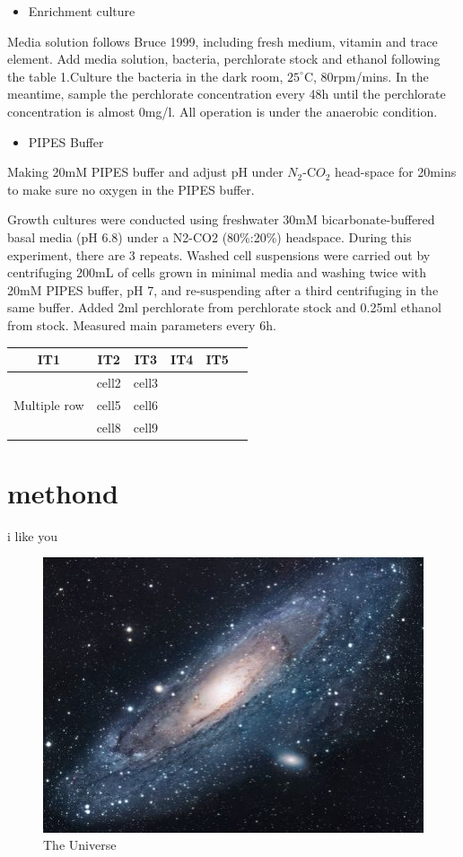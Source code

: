 \documentclass{article}
\begin{document}
\begin{itemize}
\item Enrichment culture 
\end{itemize}
Media solution follows Bruce 1999, including fresh medium, vitamin and trace element. Add media solution, bacteria, perchlorate stock and ethanol following the table 1.Culture the bacteria in the dark room, $25^\circ$C, 80rpm/mins. In the meantime, sample the perchlorate concentration every 48h until the perchlorate concentration is almost 0mg/l. All operation is under the anaerobic condition.
\begin{itemize}
\item PIPES Buffer 
\end{itemize}
Making 20mM PIPES buffer and adjust pH under $N_{2}$-C$O_{2}$ head-space for 20mins to make sure no oxygen in the PIPES buffer.



Growth cultures were conducted using freshwater 30mM bicarbonate-buffered basal media (pH 6.8) under a N2-CO2 (80\%:20\%) headspace. During this experiment, there are 3 repeats. Washed cell suspensions were carried out by centrifuging 200mL of cells grown in minimal media and washing twice with 20mM PIPES buffer, pH 7, and re-suspending after a third centrifuging in the same buffer.	Added 2ml perchlorate from perchlorate stock and 0.25ml ethanol from stock. Measured main parameters every 6h.

\begin{center}
\begin{tabular}{ |c|c|c|c|c|c|} 
\hline
IT1 & IT2 & IT3& IT4& IT5 \\
\hline
\multirow{5}{5em}{Multiple row} & cell2 & cell3 \\ 
& cell5 & cell6 \\ 
& cell8 & cell9 \\ 
\hline
\end{tabular}
\end{center}





\section{methond}
i like you 
\textbf{}
\begin{figure}[h!]
\centering
\includegraphics[scale=1.7]{universe}
\caption{The Universe}
\label{fig:universe}
\end{figure}
\end{document}
